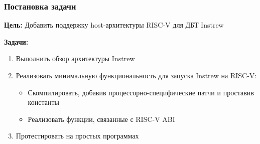 \documentclass{beamer}
\begin{document}



\begin{frame}
  \frametitle{Постановка задачи}
  \textbf{Цель:} Добавить поддержку host-архитектуры RISC-V для ДБТ Instrew

  \vspace{5mm}
  \textbf{Задачи:}
  \begin{enumerate}
    \item Выполнить обзор архитектуры Instrew
    \item Реализовать минимальную функциональность для запуска Instrew
          на RISC-V:
          \begin{itemize}
            \item Скомпилировать, добавив процессорно-специфические патчи и проставив константы
            \item Реализовать функции, связанные с RISC-V ABI
          \end{itemize}
    \item Протестировать на простых программах
  \end{enumerate}
\end{frame}
\end{document}
